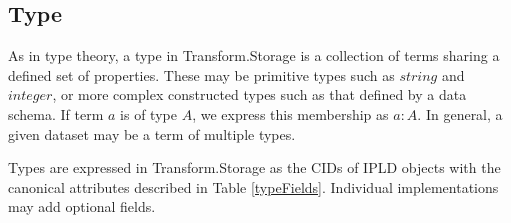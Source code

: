 \documentclass[9pt, oneside]{article}   	%
\begin{document}
\begin{multicols}{2}
\subsection{Type}\label{type}

As in type theory, a type in Transform.Storage is a collection of terms sharing a defined set of properties. These may be primitive types such as $string$ and $integer$, or more complex constructed types such as that defined by a data schema. If term $a$ is of type $A$, we express this membership as $a:A$. In general, a given dataset may be a term of multiple types.

Types are expressed in Transform.Storage as the CIDs of IPLD objects with the canonical attributes described in Table \ref{typeFields}. Individual implementations may add optional fields.


\end{multicols}
\end{document}
